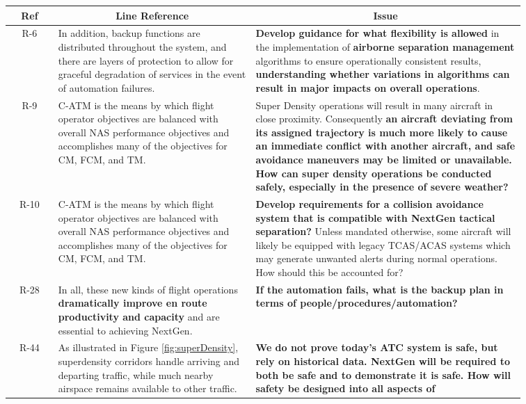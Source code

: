 \documentclass[a4paper, 10pt]{IEEEtran}
\begin{document}
\begin{table}[ht]
\begin{center}
    \begin{tabular}{|p{0.08\linewidth}|p{0.33\linewidth}|p{0.45\linewidth}|}
    \hline
    \multicolumn{1}{|c|}{\textbf{Ref}} & \multicolumn{1}{|c|}{\textbf{Line
Reference}}& \multicolumn{1}{|c|}{\textbf{Issue}}\\
    \hline
    \multicolumn{1}{|c|}{R-6} & In addition, backup functions are distributed throughout the system, and there are layers of protection to allow for graceful degradation of services in the event of automation failures. & \textbf{Develop guidance for what flexibility is allowed} in the implementation of \textbf{airborne separation management} algorithms to ensure operationally consistent results, \textbf{understanding whether variations in algorithms can result in major impacts on overall operations}.\\
    \hline
       \multicolumn{1}{|c|}{R-9} & C-ATM is the means by which flight operator objectives are balanced with overall NAS performance objectives and accomplishes many of the objectives for CM, FCM, and TM. & Super Density operations will result in many aircraft in close proximity. Consequently \textbf{an aircraft deviating from its assigned trajectory is much more likely to cause an  immediate conflict with another aircraft, and safe avoidance maneuvers may be limited or unavailable. How can super density operations be conducted safely, especially in the presence of severe weather?}\\
    \hline
\multicolumn{1}{|c|}{R-10} & C-ATM is the means by which flight operator objectives are balanced with overall NAS performance objectives and accomplishes many of the objectives for CM, FCM, and TM.& \textbf{Develop requirements for a collision avoidance system that is compatible with NextGen tactical separation?} Unless mandated otherwise, some aircraft will likely be equipped with legacy TCAS/ACAS systems which may generate unwanted alerts during normal operations. How should this be accounted for?\\
    \hline
    \multicolumn{1}{|c|}{R-28} & In all, these new kinds of flight operations \textbf{dramatically improve en route productivity and capacity} and are essential to achieving NextGen. & \textbf{If the automation fails, what is the backup plan in terms of people/procedures/automation?}\\
\hline
\multicolumn{1}{|c|}{R-44} & As illustrated in Figure \ref{fig:superDensity}, superdensity corridors handle arriving and departing traffic, while much nearby airspace remains available to other traffic.& \textbf{We do not prove today's ATC system is safe, but rely on historical data. NextGen will be required to both be safe and to demonstrate it is safe. How will safety be designed into all aspects of
}
\end{tabular}
\end{center}
\end{table}
\end{document}
